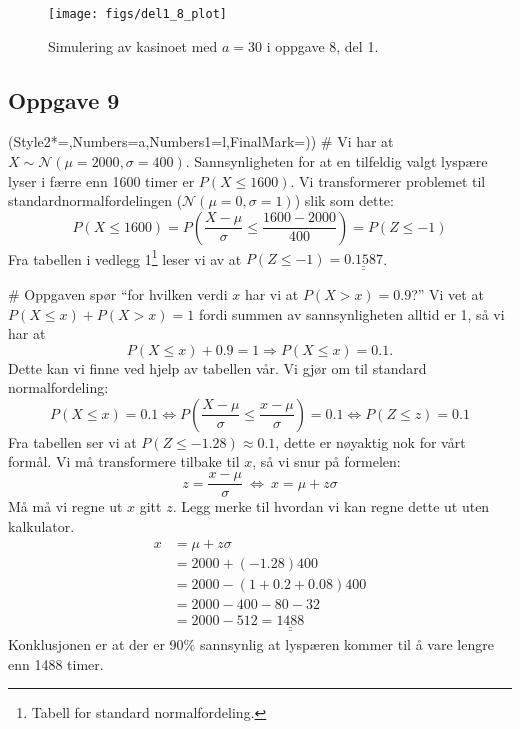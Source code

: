 \documentclass[12pt, a4paper]
{article}						%
\def\answer#1{\underline{\underline{#1}}}
\begin{document}
\begin{easylist}[enumerate]
	\begin{figure}[th!]
		\centering
		\texttt{[image: figs/del1\_8\_plot]}
		\caption{Simulering av kasinoet med $a = 30$ i oppgave 8, del 1.}
		\label{fig:del18plot}
	\end{figure}
\end{easylist}

\subsection*{Oppgave 9}
\begin{easylist}[enumerate]
	\ListProperties(Style2*=,Numbers=a,Numbers1=l,FinalMark={)})
	# Vi har at $X \sim \mathcal{N}(\mu = 2000, \sigma = 400)$. Sannsynligheten for at en tilfeldig valgt lyspære lyser i færre enn 1600 timer er $P(X \leq 1600)$. Vi transformerer problemet til standardnormalfordelingen ($\mathcal{N}(\mu = 0, \sigma = 1)$) slik som dette:
	\begin{equation*}
		P(X \leq 1600) =P\left(\frac{X-\mu}{\sigma} \leq \frac{1600-2000}{400} \right) = P(Z \leq -1)
	\end{equation*}
	Fra tabellen i vedlegg 1\footnote{Tabell for standard normalfordeling.} leser vi av at $P(Z \leq -1) = \answer{0.1587}$.
	
	#  Oppgaven spør ``for hvilken verdi $x$ har vi at $P(X > x) = 0.9$?'' 
	Vi vet at $P(X \leq x) + P(X > x) = 1$ fordi summen av sannsynligheten alltid er 1, så vi har at
	\begin{equation*}
		P(X \leq x) + 0.9 = 1 \Rightarrow P(X \leq x) = 0.1.
	\end{equation*}
	Dette kan vi finne ved hjelp av tabellen vår. Vi gjør om til standard normalfordeling:
	\begin{equation*}
		P(X \leq x) = 0.1 \Leftrightarrow P\left(\frac{X-\mu}{\sigma} \leq \frac{x-\mu}{\sigma}\right) = 0.1 \Leftrightarrow P(Z \leq z) = 0.1
	\end{equation*}
	Fra tabellen ser vi at $P(Z \leq -1.28) \approx 0.1$, dette er nøyaktig nok for vårt formål.
	Vi må transformere tilbake til $x$, så vi snur på formelen:
	\begin{equation*}
		z = \frac{x - \mu}{\sigma} \ \Leftrightarrow \ x = \mu + z \sigma
	\end{equation*}
	Må må vi regne ut $x$ gitt $z$. Legg merke til hvordan vi kan regne dette ut uten kalkulator.
	\begin{align*}
		x &= \mu + z \sigma \\
		  &= 2000 + (-1.28) 400 \\
		  &= 2000 - (1+0.2 + 0.08)400 \\
		  &= 2000 - 400 - 80 - 32 \\
		  &= 2000 - 512 = \answer{1488}
	\end{align*}
	Konklusjonen er at der er 90\% sannsynlig at lyspæren kommer til å vare lengre enn 1488 timer.
	

\end{easylist}
\end{document}
